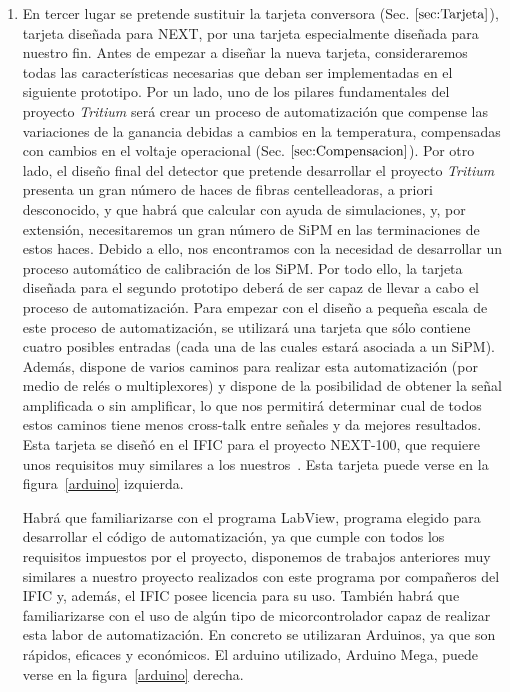 \begin{enumerate}
\item{} En tercer lugar se pretende sustituir la tarjeta conversora (Sec. $\ref{sec:Tarjeta}$), tarjeta diseñada para NEXT, por una tarjeta especialmente diseñada para nuestro fin. Antes de empezar a diseñar la nueva tarjeta,  consideraremos todas las características necesarias que deban  ser implementadas  en el siguiente prototipo.
Por un lado, uno de los pilares fundamentales del proyecto \textit{Tritium} será crear un proceso de automatización que compense las variaciones de la ganancia debidas a cambios en la temperatura, compensadas con cambios en el voltaje operacional (Sec. $\ref{sec:Compensacion}$).
Por otro lado, el diseño final del detector que pretende desarrollar el proyecto \textit{Tritium} presenta un gran número de haces de fibras centelleadoras, a priori  desconocido, y que habrá que calcular con ayuda de simulaciones, y, por extensión, necesitaremos un gran número de SiPM en las terminaciones de estos haces. Debido a ello, nos encontramos con la necesidad de desarrollar un proceso automático de calibración de los SiPM.  
Por todo ello, la tarjeta diseñada para el segundo prototipo deberá de ser capaz de llevar a cabo el proceso  de automatización. 
Para empezar con el diseño a pequeña escala de este proceso de automatización, se utilizará una tarjeta que sólo contiene cuatro posibles entradas (cada una de las cuales estará asociada a un SiPM). Además, dispone de varios caminos para realizar esta automatización (por medio de relés o multiplexores) y dispone de la posibilidad de obtener la señal amplificada o sin amplificar, lo que nos permitirá determinar cual de todos estos caminos tiene menos cross-talk entre señales y da mejores resultados. Esta tarjeta  se diseñó en el IFIC para el proyecto NEXT-100, que requiere unos requisitos muy similares a los nuestros~\cite{Marc}. Esta tarjeta puede verse en la figura~\ref{arduino} izquierda.

Habrá que familiarizarse con el programa LabView, programa elegido para desarrollar el código de automatización, ya que cumple con todos los requisitos impuestos por el proyecto, disponemos de trabajos anteriores muy similares a nuestro proyecto realizados con este programa por compañeros del IFIC y, además, el IFIC posee licencia para su uso. También habrá que familiarizarse con el uso de algún tipo de micorcontrolador capaz de realizar esta labor de automatización. En concreto se utilizaran Arduinos, ya que son rápidos, eficaces y económicos. El arduino utilizado, Arduino Mega, puede verse  en la figura~\ref{arduino}  derecha.


\end{enumerate}
